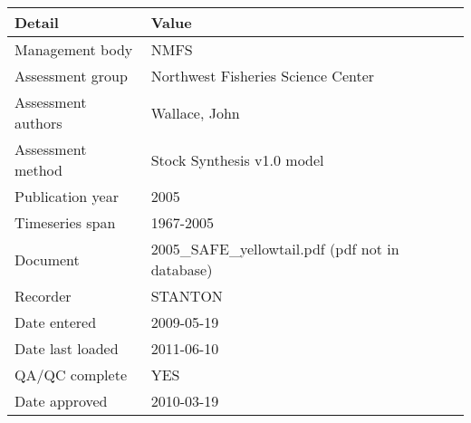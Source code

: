 \begin{table}[htb]
\centering
\begin{tabular}{lp{7cm}}
\toprule
Detail & Value \\
\midrule
Management body    & NMFS                                             \\
Assessment group   & Northwest Fisheries Science Center               \\
Assessment authors & Wallace, John                                    \\
Assessment method  & Stock Synthesis v1.0 model                       \\
Publication year   & 2005                                             \\
Timeseries span    & 1967-2005                                        \\
Document           & 2005\_SAFE\_yellowtail.pdf (pdf not in database) \\
Recorder           & STANTON                                          \\
Date entered       & 2009-05-19                                       \\
Date last loaded   & 2011-06-10                                       \\
QA/QC complete     & YES                                              \\
Date approved      & 2010-03-19                                       \\
\bottomrule
\end{tabular}
\label{tab:assessdet}
\end{table}
